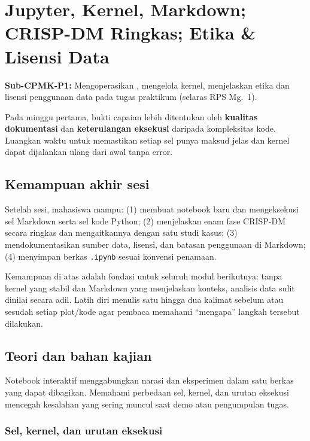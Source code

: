 \documentclass[../main.tex]{subfiles}
\begin{document}
\chapter{Jupyter, Kernel, Markdown; CRISP-DM Ringkas; Etika \& Lisensi Data}

\begin{subcpmk}
  \item \textbf{Sub-CPMK-P1:} Mengoperasikan \jupyter{}, mengelola kernel, menjelaskan etika dan lisensi penggunaan data pada tugas praktikum (selaras RPS Mg.\ 1).
\end{subcpmk}


\noindent Pada minggu pertama, bukti capaian lebih ditentukan oleh \textbf{kualitas dokumentasi} dan \textbf{keterulangan eksekusi} daripada kompleksitas kode. Luangkan waktu untuk memastikan setiap sel punya maksud jelas dan kernel dapat dijalankan ulang dari awal tanpa error.

\section{Kemampuan akhir sesi}

Setelah sesi, mahasiswa mampu: (1) membuat notebook baru dan mengeksekusi sel Markdown serta sel kode Python; (2) menjelaskan enam fase CRISP-DM secara ringkas dan mengaitkannya dengan satu studi kasus; (3) mendokumentasikan sumber data, lisensi, dan batasan penggunaan di Markdown; (4) menyimpan berkas \texttt{.ipynb} sesuai konvensi penamaan.

Kemampuan di atas adalah fondasi untuk seluruh modul berikutnya: tanpa kernel yang stabil dan Markdown yang menjelaskan konteks, analisis data sulit dinilai secara adil. Latih diri menulis satu hingga dua kalimat sebelum atau sesudah setiap plot/kode agar pembaca memahami ``mengapa'' langkah tersebut dilakukan.

\section{Teori dan bahan kajian}

Notebook interaktif menggabungkan narasi dan eksperimen dalam satu berkas yang dapat dibagikan. Memahami perbedaan sel, kernel, dan urutan eksekusi mencegah kesalahan yang sering muncul saat demo atau pengumpulan tugas.

\subsection{Sel, kernel, dan urutan eksekusi}
\end{document}
